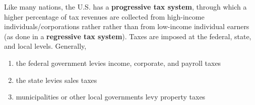 \documentclass{article}
\begin{document}
    \begin{definition}
      \label{def:progressive-regressive-tax-system}
      Like many nations, the U.S. has a \textbf{progressive tax system}, through which a higher percentage of tax revenues are collected from high-income individuals/corporations rather rather than from low-income individual earners (as done in a \textbf{regressive tax system}). Taxes are imposed at the federal, state, and local levels. Generally, 
      \begin{enumerate}
        \item the federal government levies income, corporate, and payroll taxes
        \item the state levies sales taxes
        \item municipalities or other local governments levy property taxes
      \end{enumerate}
    \end{definition}
\end{document}
